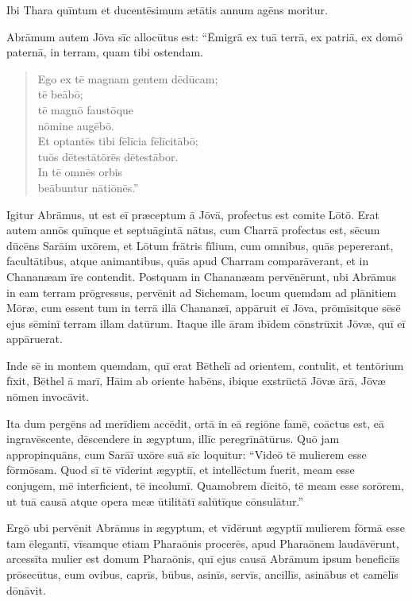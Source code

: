 \Versus Ibi Thara quīntum et ducentēsimum ætātis annum agēns moritur.



\Caput
\Versus Abrāmum autem Jōva sīc allocūtus est: ``Ēmigrā ex tuā terrā, ex patriā, ex domō paternā, in terram, quam tibi ostendam.

\begin{verse}
\begin{patverse*}
\Versus Ego ex tē magnam gentem dēdūcam; \\
tē beābō; \\
tē magnō faustōque \\
nōmine augēbō.\\
\Versus Et optantēs tibi fēlīcia fēlīcitābō; \\
tuōs dētestātōrēs dētestābor. \\
In tē omnēs orbis \\
beābuntur nātiōnēs.''
\end{patverse*}
\end{verse}

\Versus Igitur Abrāmus, ut est eī præceptum ā Jōvā, profectus est comite Lōtō. Erat autem annōs quīnque et septuāgintā nātus, cum Charrā profectus est,
\Versus sēcum dūcēns Sarāim uxōrem, et Lōtum frātris fīlium, cum omnibus, quās pepererant, facultātibus, atque animantibus, quās apud Charram comparāverant, et in Chananæam īre contendit. Postquam in Chananæam pervēnērunt,
\Versus ubi Abrāmus in eam terram prōgressus, pervēnit ad Sichemam, locum quemdam ad plānitiem Mōræ, cum essent tum in terrā illā Chananæī,
\Versus appāruit eī Jōva, prōmīsitque sēsē ejus sēminī terram illam datūrum. Itaque ille āram ibīdem cōnstrūxit Jōvæ, quī eī appāruerat.

\Versus Inde sē in montem quemdam, quī erat Bēthelī ad orientem, contulit, et tentōrium fīxit, Bēthel ā marī, Hāim ab oriente habēns, ibique exstrūctā Jōvæ ārā, Jōvæ nōmen invocāvit.

\Versus Ita dum pergēns ad merīdiem accēdit,
\Versus ortā in eā regiōne famē, coāctus est, eā ingravēscente, dēscendere in ægyptum, illīc peregrīnātūrus.
\Versus Quō jam appropinquāns, cum Sarāī uxōre suā sīc loquitur: ``Videō tē mulierem esse fōrmōsam.
\Versus Quod sī tē vīderint ægyptiī, et intellēctum fuerit, meam esse conjugem, mē interficient, tē incolumī.
\Versus Quamobrem dīcitō, tē meam esse sorōrem, ut tuā causā atque opera meæ ūtilitātī salūtīque cōnsulātur.''

\Versus Ergō ubi pervēnit Abrāmus in ægyptum, et vīdērunt ægyptiī mulierem fōrmā esse tam ēlegantī,
\Versus vīsamque etiam Pharaōnis procerēs, apud Pharaōnem laudāvērunt, arcessīta mulier est domum Pharaōnis,
\Versus quī ejus causā Abrāmum ipsum beneficiīs prōsecūtus, eum ovibus, caprīs, būbus, asinīs, servīs, ancillīs, asinābus et camēlīs dōnāvit.

